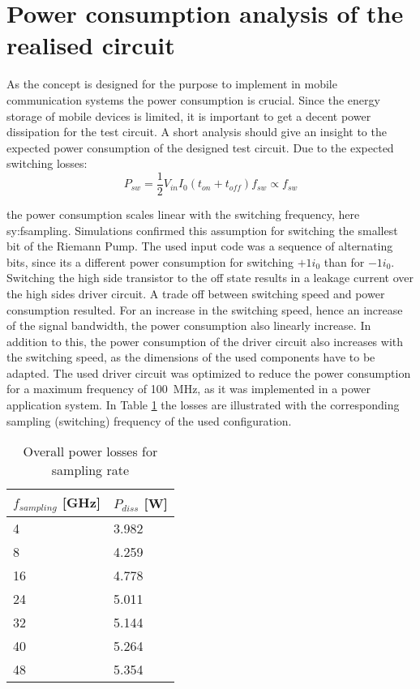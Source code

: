 \section{Power consumption analysis of the realised circuit}
As the concept is designed for the purpose to implement in mobile communication systems the power consumption is crucial.
Since the energy storage of mobile devices is limited, it is important to get a decent power dissipation for the test circuit.
A short analysis should give an insight to the expected power consumption of the designed test circuit.
Due to the expected switching losses:
\begin{equation}
 P_{sw} = \frac{1}{2} V_{in}I_0(t_{on}+t_{off})f_{sw} \propto f_{sw}
 \label{eq:swtichloss}
\end{equation}

the power consumption scales linear with the switching frequency, here \gls{sy:fsampling}.
Simulations confirmed this assumption for switching the smallest bit of the Riemann Pump.
The used input code was a sequence of alternating bits, since its a different power consumption for switching $+1 i_0$ than for $-1 i_0$.
Switching the high side transistor to the off state results in a leakage current over the high sides driver circuit.
A trade off between switching speed and power consumption resulted.
For an increase in the switching speed, hence an increase of the signal bandwidth, the power consumption also linearly increase.
In addition to this, the power consumption of the driver circuit also increases with the switching speed, as the dimensions of the used components have to be adapted.
The used driver circuit was optimized to reduce the power consumption for a maximum frequency of \SI{100}{\mega \hertz}, as it was implemented in a power application system.
In Table \ref{tab:switchloss} the losses are illustrated with the corresponding sampling (switching) frequency of the used configuration.

\begin{table}[ht]
\centering
\begin{tabular}{|l|l|}
\hline
$f_{sampling}$ {[}GHz{]} & $P_{diss}$ {[}W{]} \\ \hline
4                    & 3.982              \\ \hline
8                    & 4.259              \\ \hline
16                   & 4.778              \\ \hline
24                   & 5.011              \\ \hline
32                   & 5.144              \\ \hline
40                   & 5.264              \\ \hline
48                   & 5.354              \\ \hline
\end{tabular}
\caption{Overall power losses for sampling rate}
\label{tab:switchloss}
\end{table}

